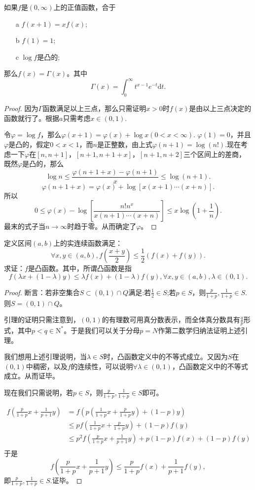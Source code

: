   \begin{example}
  如果$f$是$(0,\infty)$上的正值函数，合于
  \begin{enumerate}
  \item[a] $f(x+1)=xf(x)$;
  \item[b] $f(1)=1$;
  \item[c] $\log f$是凸的;
  \end{enumerate}
  那么$f(x)=\Gamma(x)$。其中$$\Gamma(x)=\int_0^{\infty}t^{x-1}e^{-t}\mathrm{d}t.$$
\end{example} 
\begin{proof}
  因为$\Gamma$函数满足以上三点，那么只需证明$x>0$时$f(x)$是由以上三点决定的函数就行了。根据$a$只需考虑$x\in(0,1).$
  
  令$\varphi =\log f$，那么$\varphi(x+1)=\varphi(x)+\log x(0<x<\infty).$ $\varphi(1)=0$，并且$\varphi$是凸的，假定$0<x<1$，而$n$是正整数，由上式$\varphi(n+1)=\log (n!).$现在考虑一下$\varphi$在$[n,n+1]$，$[n+1,n+1+x]$，$[n+1,n+2]$三个区间上的差商，既然$\varphi$是凸的，那么$$\log n\leq\frac{\varphi(n+1+x)-\varphi(n+1)}{x}\leq\log(n+1).$$
  $$\varphi(n+1+x)=\varphi(x)+\log[x(x+1)\cdots(x+n)].$$
  所以$$0\leq\varphi(x)-\log[\frac{n!n^x}{x(n+1)\cdots(x+n)}]\leq x\log(1+\frac{1}{n}).$$
  最末的式子当$n\to\infty$时趋于零。从而确定了$\varphi$。
  \end{proof}
 
\begin{example}
定义区间$(a,b)$上的实连续函数满足：
$$\forall x,y \in(a,b),f(\frac{x+y}{2})\leq\frac{1}{2}(f(x)+f(y)).$$
求证：$f$是凸函数。其中，所谓凸函数是指
$$f(\lambda x+(1-\lambda)y)\leq\lambda f(x)+(1-\lambda)f(y),\forall x,y\in(a,b),\lambda\in(0,1).$$
\end{example}

\begin{proof}
断言：若非空集合$S\subset(0,1)\cap\mathit{Q}$满足:若$\frac{1}{2}\in S$;若$p\in S$，则$\frac{p}{1+p},\frac{1}{1+p}\in S.$则$S=(0,1)\cap\mathit{Q}$。

引理的证明只需注意到，$(0,1)$的有理数可用真分数表示，而全体真分数具有$\frac{q}{p}$形式，其中$p<q\in\mathrm{N}^*$。于是我们可以关于分母$p=N$作第二数学归纳法证明上述引理。

我们想用上述引理说明，当$\lambda\in S$时，凸函数定义中的不等式成立。又因为$S$在$(0,1)$中稠密，以及$f$的连续性，可以说明$\forall\lambda\in(0,1)$，凸函数定义中的不等式成立。从而证毕。

现在我们只需说明，若$p\in S$，则$\frac{p}{1+p},\frac{1}{1+p}\in S$即可。

\begin{align*}
f(\frac{p}{1+p}x+\frac{1}{p+1}y)&=f(p(\frac{1}{1+p}x+\frac{p}{1+p}y)+(1-p)y)\\
&\leq pf(\frac{1}{1+p}x+\frac{p}{1+p}y)+(1-p)f(y)\\
&\leq p^2f(\frac{p}{1+p}x+\frac{1}{p+1}y)+p(1-p)f(x)+(1-p)f(y)\\
\end{align*}
于是
$$f(\frac{p}{1+p}x+\frac{1}{p+1}y)\leq \frac{p}{1+p}f(x)+\frac{1}{p+1}f(y),$$
即$\frac{p}{1+p},\frac{1}{1+p}\in S.$证毕。
\end{proof}
 
